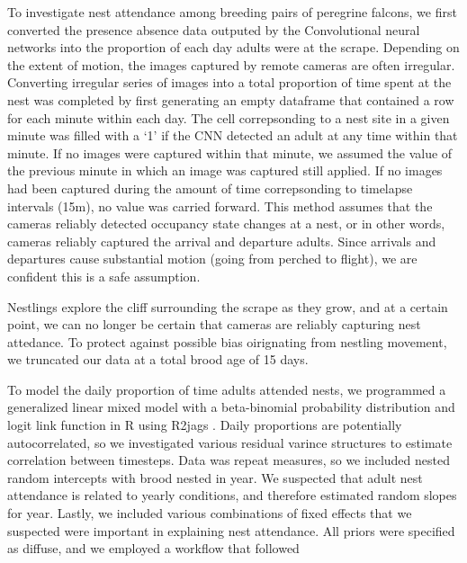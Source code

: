 To investigate nest attendance among breeding pairs of peregrine falcons, we first converted the presence absence data outputed by the Convolutional neural networks into the proportion of each day adults were at the scrape.
Depending on the extent of motion, the images captured by remote cameras are often irregular.
Converting irregular series of images into a total proportion of time spent at the nest was completed by first generating an empty dataframe that contained a row for each minute within each day. 
The cell correpsonding to a nest site in a given minute was filled with a `1' if the CNN detected an adult at any time within that minute.
If no images were captured within that minute, we assumed the value of the previous minute in which an image was captured still applied.
If no images had been captured during the amount of time correpsonding to timelapse intervals (15m), no value was carried forward.
This method assumes that the cameras reliably detected occupancy state changes at a nest, or in other words, cameras reliably captured the arrival and departure adults.
Since arrivals and departures cause substantial motion (going from perched to flight), we are confident this is a safe assumption.

Nestlings explore the cliff surrounding the scrape as they grow, and at a certain point, we can no longer be certain that cameras are reliably capturing nest attedance.
To protect against possible bias oirignating from nestling movement, we truncated our data at a total brood age of 15 days.
 



To model the daily proportion of time adults attended nests, we programmed a generalized linear mixed model with a beta-binomial probability distribution and logit link function in R using R2jags \cite{}. 
Daily proportions are potentially autocorrelated, so we investigated various residual varince structures to estimate correlation between timesteps.
Data was repeat measures, so we included nested random intercepts with brood nested in year.
We suspected that adult nest attendance is related to yearly conditions, and therefore estimated random slopes for year.
Lastly, we included various combinations of fixed effects that we suspected were important in explaining nest attendance. 
All priors were specified as diffuse, and we employed a workflow that followed \cite{} %



